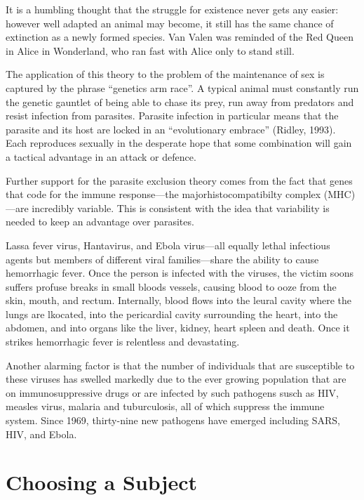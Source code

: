 It is a humbling thought that the struggle for existence never gets any easier: however well adapted an animal may become, it still has the same chance of extinction as a newly formed species. Van Valen was reminded of the Red Queen in Alice in Wonderland, who ran fast with Alice only to stand still. 

The application of this theory to the problem of the maintenance of sex is captured by the phrase “genetics arm race”. A typical animal must constantly run the genetic gauntlet   of being able to chase its prey, run away from predators and resist infection from parasites. Parasite infection in particular means that the parasite and its host are locked in an “evolutionary embrace” (Ridley, 1993). Each reproduces sexually in the desperate hope that some combination will gain a tactical advantage in an attack or defence. 

Further support for the parasite exclusion theory comes from the fact that genes that code for the immune response---the majorhistocompatibilty complex (MHC)---are incredibly variable. This is consistent with the idea that variability is needed to keep an advantage over parasites.

Lassa fever virus, Hantavirus, and Ebola virus---all equally lethal infectious agents but members of different viral families---share the ability to cause hemorrhagic fever. Once the person is infected with the viruses, the victim soons suffers profuse breaks in small bloods vessels, causing blood to ooze from the skin, mouth, and rectum. Internally, blood flows into the leural cavity where the lungs are lkocated, into the pericardial cavity surrounding the heart, into
the abdomen, and into organs like the liver, kidney, heart spleen and death. Once it strikes hemorrhagic fever is relentless and devastating.

Another alarming factor is that the number of individuals that are susceptible to these viruses has swelled markedly due to the ever growing population that are on immunosuppressive drugs or are infected by such pathogens susch as HIV, measles virus, malaria and tuburculosis, all of which suppress the immune system. Since 1969, thirty-nine new pathogens have emerged including SARS, HIV, and Ebola. 


\chapter{Choosing a Subject}

